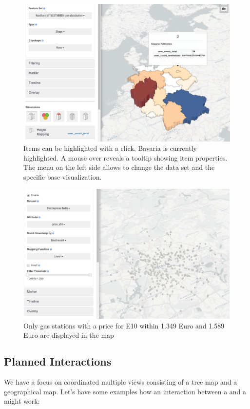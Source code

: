\begin{figure}[h!]
  \centering
  \includegraphics[width=\textwidth]{images/existing-interactions.png}
  \caption{%
    Items can be highlighted with a click, Bavaria is currently highlighted.
    A mouse over reveals a tooltip showing item properties.
    The menu on the left side allows to change the data set and the specific base visualization.
  }\label{fig:analysis:interaction:existing}
\end{figure}

\begin{figure}[h!]
  \centering
  \includegraphics[width=\textwidth]{images/existing-interactions-filter.png}
  \caption{%
    Only gas stations with a price for E10 within 1.349 Euro and 1.589 Euro are displayed in the map
  }\label{fig:analysis:interaction:existing:filter}
\end{figure}

\subsection{Planned Interactions}
We have a focus on coordinated multiple views consisting of a tree map and a geographical map.
Let's have some examples how an interaction between a \tmap{} and a \map{} might work:

